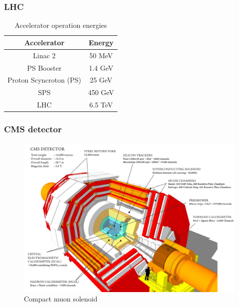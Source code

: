 \documentclass[11pt]{beamer}
\begin{document}
\begin{frame}
\frametitle{LHC}
\begin{table}
	\caption*{Accelerator operation energies}
	\begin{tabular}{|c|c|}
		\hline
		Accelerator & Energy \\
		\hline
		Linac 2 &  50 MeV \\
		\hline
		PS Booster & 1.4 GeV \\
		\hline
		Proton Scyncroton (PS) & 25 GeV\\
		\hline
		SPS &  450 GeV\\
		\hline
		LHC & 6.5 TeV\\
		\hline
	\end{tabular}
\end{table}
\end{frame}

\begin{frame}
\frametitle{CMS detector}
\begin{center}
	\begin{figure}
		\includegraphics[scale=0.08]{figures/cms.png}
		\caption{Compact muon solenoid}
	\end{figure}
\end{center}
\end{frame}
\end{document}
